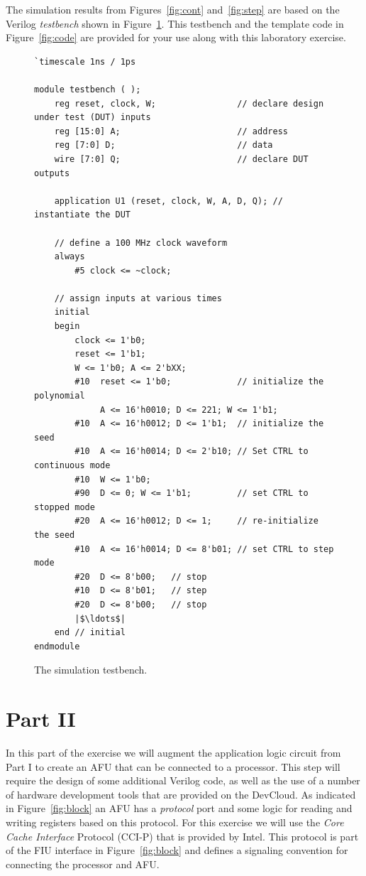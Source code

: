 \documentclass[epsfig,10pt,fullpage]{article}
\begin{document}
\noindent
The simulation results from Figures~\ref{fig:cont} and~\ref{fig:step} are based on the
Verilog {\it testbench} shown in Figure~\ref{fig:tb}. This testbench and the template code
in Figure~\ref{fig:code} are provided for your use along with this laboratory exercise.

\lstset{language=Verilog,numbers=none,escapechar=|}
\begin{figure}[H]
\begin{center}
\begin{minipage}[h]{15 cm}
\begin{lstlisting}[name=code]
`timescale 1ns / 1ps

module testbench ( );
    reg reset, clock, W;                // declare design under test (DUT) inputs
    reg [15:0] A;                       // address
    reg [7:0] D;                        // data
    wire [7:0] Q;                       // declare DUT outputs

    application U1 (reset, clock, W, A, D, Q); // instantiate the DUT

    // define a 100 MHz clock waveform
    always
        #5 clock <= ~clock;
    
    // assign inputs at various times
    initial 
    begin
        clock <= 1'b0;
        reset <= 1'b1;
        W <= 1'b0; A <= 2'bXX;
        #10  reset <= 1'b0;             // initialize the polynomial
             A <= 16'h0010; D <= 221; W <= 1'b1;
        #10  A <= 16'h0012; D <= 1'b1;  // initialize the seed
        #10  A <= 16'h0014; D <= 2'b10; // Set CTRL to continuous mode
        #10  W <= 1'b0;
        #90  D <= 0; W <= 1'b1;         // set CTRL to stopped mode
        #20  A <= 16'h0012; D <= 1;     // re-initialize the seed
        #10  A <= 16'h0014; D <= 8'b01; // set CTRL to step mode
        #20  D <= 8'b00;   // stop
        #10  D <= 8'b01;   // step
        #20  D <= 8'b00;   // stop
        |$\ldots$|
    end // initial
endmodule
\end{lstlisting}
\end{minipage}
\caption{The simulation testbench.}
\label{fig:tb}
\end{center}
\end{figure}
\section*{Part II}
In this part of the exercise we will augment the application logic circuit from Part I 
to create an AFU that can be connected to a processor. This step will require the
design of some additional Verilog code, as well as the use of
a number of hardware development tools that are provided on the DevCloud.
As indicated in Figure~\ref{fig:block} an AFU has a {\it protocol} port and some logic for
reading and writing registers based on this protocol. For this exercise we will use the
{\it Core Cache Interface} Protocol (CCI-P) that is provided by Intel. This protocol
is part of the FIU interface in Figure~\ref{fig:block} and 
defines a signaling convention for connecting the processor and AFU. 
\end{document}
